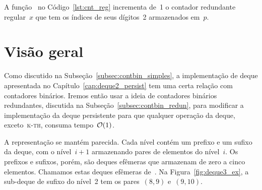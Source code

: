 \documentclass[../../main.tex]{subfiles}
\begin{document}
A função~ no Código~\ref{lst:cnt_reg} incrementa de~1 o contador redundante regular~$x$ que tem os índices de seus dígitos~2 armazenados em~$p$.

\section{Visão geral}

Como discutido na Subseção~\ref{subsec:contbin_simples}, a implementação de deque apresentada no Capítulo~\ref{cap:deque2_persist} tem uma certa relação com contadores binários. Iremos então usar a ideia de contadores binários redundantes, discutida na Subseção~\ref{subsec:contbin_redun}, para modificar a implementação da deque persistente para que qualquer operação da deque, exceto~\textsc{k-th}, consuma tempo~$\mathcal{O}(1)$.

A representação se mantém parecida. Cada nível contém um prefixo e um sufixo da deque, com o nível~$i+1$ armazenando pares de elementos do nível~$i$. Os prefixos e sufixos, porém, são deques efêmeras que armazenam de zero a cinco elementos. Chamamos estas deques efêmeras de~. Na Figura~\ref{fig:deque3_ex}, a sub-deque de sufixo do nível~2 tem os pares~$(8, 9)$ e~$(9, 10)$.

\end{document}
